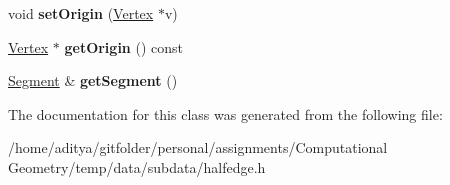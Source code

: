 \begin{DoxyCompactItemize}
\item 
\hypertarget{class_half_edge_aa15c872a98e7e38445a7450533ceac73}{}void {\bfseries set\+Origin} (\hyperlink{class_vertex}{Vertex} $\ast$v)\label{class_half_edge_aa15c872a98e7e38445a7450533ceac73}

\item 
\hypertarget{class_half_edge_a99385cc652682692c7e73a42b999b86f}{}\hyperlink{class_vertex}{Vertex} $\ast$ {\bfseries get\+Origin} () const \label{class_half_edge_a99385cc652682692c7e73a42b999b86f}

\item 
\hypertarget{class_half_edge_aba376d76abd820450638f0224aa0ec53}{}\hyperlink{class_segment}{Segment} \& {\bfseries get\+Segment} ()\label{class_half_edge_aba376d76abd820450638f0224aa0ec53}

\end{DoxyCompactItemize}


The documentation for this class was generated from the following file\+:\begin{DoxyCompactItemize}
\item 
/home/aditya/gitfolder/personal/assignments/\+Computational Geometry/temp/data/subdata/halfedge.\+h\end{DoxyCompactItemize}
